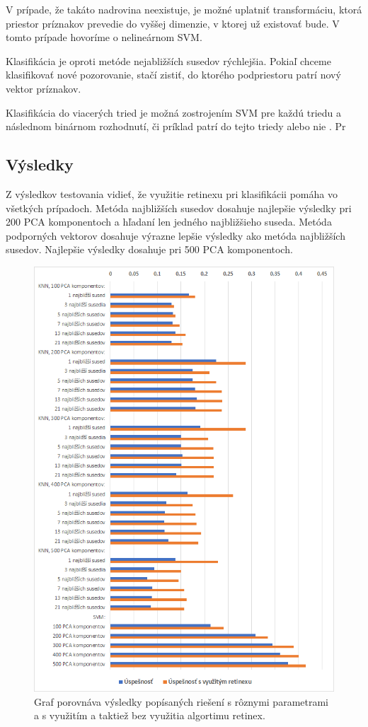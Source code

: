 V prípade, že takáto nadrovina neexistuje, je možné uplatniť transformáciu, ktorá priestor príznakov prevedie do vyššej dimenzie, v ktorej už existovať bude.
V tomto prípade hovoríme o nelineárnom SVM.

Klasifikácia je oproti metóde nejabližších susedov rýchlejšia.
Pokiaľ chceme klasifikovať nové pozorovanie, stačí zistiť, do ktorého podpriestoru patrí nový vektor príznakov.

Klasifikácia do viacerých tried je možná zostrojením SVM pre každú triedu a následnom binárnom rozhodnutí, či príklad patrí do tejto triedy alebo nie \cite{svm}. 
Pr

\subsection{Výsledky}
Z výsledkov testovania vidieť, že využitie retinexu pri klasifikácii pomáha vo všetkých prípadoch.
Metóda najbližších susedov dosahuje najlepšie výsledky pri 200 PCA komponentoch a hľadaní len jedného najbližšieho suseda.
Metóda podporných vektorov dosahuje výrazne lepšie výsledky ako metóda najbližších susedov.
Najlepšie výsledky dosahuje pri 500 PCA komponentoch.

\begin{figure}[H]
\centerline{\includegraphics[width=1\textwidth]{images/graph_features_compare}}
\caption[Výsledky porovnania metód]{Graf porovnáva výsledky popísaných riešení s rôznymi parametrami a s využitím a taktiež bez využitia algortimu retinex.}
\label{obr:graph_features_compare.png}
\end{figure}

